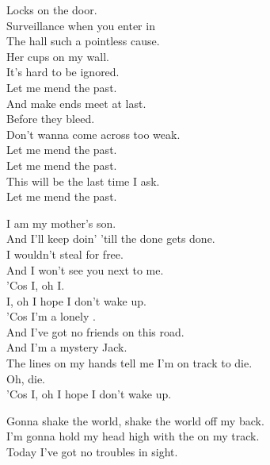 Locks on the door. \\
Surveillance when you enter in \\
The hall such a pointless cause. \\
Her cups on my wall. \\
It's hard to be ignored. \\

Let me mend the past. \\
And make ends meet at last. \\
Before they bleed. \\
Don't wanna come across too weak. \\

Let me mend the past. \\
Let me mend the past. \\
This will be the last time I ask. \\
Let me mend the past. \\




I am my mother's son. \\
And I'll keep doin' 'till the done gets done. \\
I wouldn't steal for free. \\
And I won't see you next to me. \\

'Cos I, oh I. \\
I, oh I hope I don't wake up. \\

'Cos I'm a lonely . \\
And I've got no friends on this road. \\
And I'm a mystery Jack. \\
The lines on my hands tell me I'm on track to die. \\

Oh, die. \\
'Cos I, oh I hope I don't wake up. \\




Gonna shake the world, shake the world off my back. \\
I'm gonna hold my head high with the  on my track. \\
Today I've got no troubles in sight. \\

